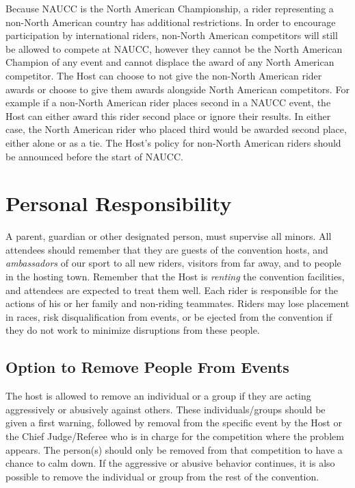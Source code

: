 Because NAUCC is the North American Championship, a rider representing a non-North American country has additional restrictions.
In order to encourage participation by international riders, non-North American competitors will still be allowed to compete at NAUCC, however they cannot be the North American Champion of any event and cannot displace the award of any North American competitor.
The Host can choose to not give the non-North American rider awards or choose to give them awards alongside North American competitors.
For example if a non-North American rider places second in a NAUCC event, the Host can either award this rider second place or ignore their results.
In either case, the North American rider who placed third would be awarded second place, either alone or as a tie.
The Host's policy for non-North American riders should be announced before the start of NAUCC.

\section{Personal Responsibility}
A parent, guardian or other designated person, must supervise all minors.
All attendees should remember that they are guests of the convention hosts, and \textit{ambassadors} of our sport to all new riders, visitors from far away, and to people in the hosting town.
Remember that the Host is \textit{renting} the convention facilities, and attendees are expected to treat them well.
Each rider is responsible for the actions of his or her family and non-riding teammates.
Riders may lose placement in races, risk disqualification from events, or be ejected from the convention if they do not work to minimize disruptions from these people.

\subsection{Option to Remove People From Events}
The host is allowed to remove an individual or a group if they are acting aggressively or abusively against others.
These individuals/groups should be given a first warning, followed by removal from the specific event by the Host or the Chief Judge/Referee who is in charge for the competition where the problem appears.
The person(s) should only be removed from that competition to have a chance to calm down.
If the aggressive or abusive behavior continues, it is also possible to remove the individual or group from the rest of the convention.

